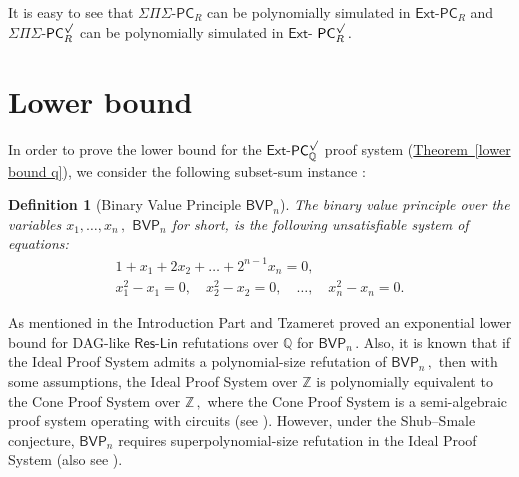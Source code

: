 \documentclass[11pt]{article}
\newcommand{\expref}[2]{\texorpdfstring{\hyperref[#2]{#1~\ref{#2}}}{#1~\ref{#2}}}
\newtheorem{definition}[theorem]{Definition}
\newcommand{\Q}{{\mathbb Q}}
\newcommand{\Z}{{\mathbb Z}}
\begin{document}
It is easy to see that $\Sigma \Pi \Sigma$-$\mathsf{PC}_R$ can be polynomially simulated in $\mathsf{Ext}$-$\mathsf{PC}_{R}$ and $\Sigma \Pi \Sigma$-$\mathsf{PC}_R^{\surd}$ can be polynomially simulated in $\mathsf{Ext}$-%
$\mathsf{PC}_{R}^{\surd}\,.$ %



\section{Lower bound}\label{section-3}

In order to prove the lower bound for the $\mathsf{Ext}$-$\mathsf{PC}^{\surd}_{\Q}$ proof system (\expref{Theorem}{lower bound q}), we consider the following subset-sum instance \cite{AGHT19_new, PT18_new}:


\begin{definition}[Binary Value Principle $\mathsf{BVP}_n$]
The \emph{binary value principle} over the variables %
$x_1,\dots, x_n\,,$ %
 $\mathsf{BVP}_n$  for short, is the following unsatisfiable system of equations:
\begin{align*}
1 + x_1 + 2 x_2 + \ldots + 2^{n - 1} x_n = 0, \\
x_1^2 - x_1 = 0, \quad x_2^2 - x_2 = 0, \quad \ldots, \quad x_n^2 - x_n = 0.
\end{align*}
\end{definition}

As %
mentioned in the %
Introduction  %
Part and Tzameret \cite{PT18_new} proved an exponential lower bound for DAG-like $\mathsf{Res}$-$\mathsf{Lin}$ refutations over $\Q$ for
%
%
$\mathsf{BVP}_n\,.$ %
 Also, it is known that if the Ideal Proof System admits
a %
%
polynomial-size refutation  %
of %
$\mathsf{BVP}_n\,,$ %
 then with some assumptions, the Ideal Proof System over $\Z$ is polynomially equivalent to the Cone Proof System over %
$\Z\,,$ %
 where the Cone Proof System is a semi-algebraic proof system operating with circuits (see \cite{AGHT19_new}). However, under the
%
Shub--Smale  %
conjecture, $\mathsf{BVP}_n$ requires %
superpolynomial-size  %
refutation in the Ideal Proof System (also see \cite{AGHT19_new}). 
\end{document}
